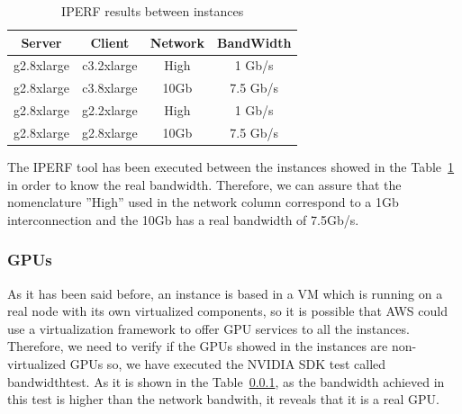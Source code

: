 \documentclass[a4paper,twoside]{article}
\begin{document}
\begin{table}[!t]
\renewcommand{\arraystretch}{1.3}
\caption{IPERF results between instances}
\label{table:iperf}
\tabcolsep=0.24cm
\begin{center}\begin{tabular}{cccc}
Server & Client & Network & BandWidth\\ \hline \hline
g2.8xlarge & c3.2xlarge & High & 1  Gb/s\\ \hline
g2.8xlarge & c3.8xlarge & 10Gb & 7.5  Gb/s\\ \hline
g2.8xlarge & g2.2xlarge & High & 1 Gb/s\\ \hline
g2.8xlarge & g2.8xlarge & 10Gb & 7.5  Gb/s\\ \hline
\end{tabular}\end{center}\end{table}

The IPERF tool has been executed between the instances showed in 
the Table~\ref{table:iperf} in order to know the real bandwidth.
Therefore, we can assure that the nomenclature ''High'' used in the 
network column correspond to a 1Gb interconnection and the 10Gb has 
a real bandwidth of 7.5Gb/s.


\subsubsection{GPUs}
As it has been said before, an instance is based in a VM 
which is running on a real node with its own virtualized 
components, so it is possible that AWS could use a virtualization 
framework to offer GPU services to all the instances.
Therefore, we need to verify if the GPUs showed in the instances are 
non-virtualized GPUs so, we have executed the NVIDIA SDK test called 
bandwidthtest. As it is shown in the Table~\ref{}, as the bandwidth achieved 
in this test is higher than the network bandwith, it reveals that it is a 
real GPU. 
\end{document}
